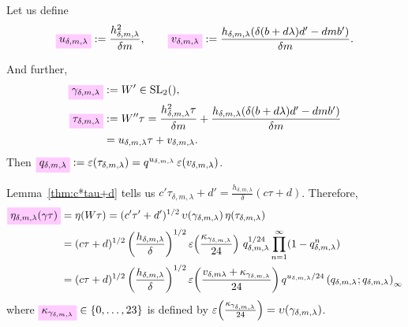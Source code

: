 \documentclass{article}
\begin{document}
Let us define
\begin{gather}
  \defineNotation[u-delta-m-lambda]{u_{\delta,m,\lambda}}
  :=
  \frac{h_{\delta,m,\lambda}^2}{\delta m},
  \qquad
  \defineNotation[v-delta-m-lambda]{v_{\delta,m,\lambda}}
  :=
  \frac{h_{\delta,m,\lambda}(\delta (b + d \lambda) d' - d m b')}{\delta m}.
  \label{eq:uv_delta-m-lambda}
\end{gather}

And further,
\begin{align}
  \defineNotation[gamma-delta-m-lambda]{\gamma_{\delta,m,\lambda}}
  &:=
    W'\in\SL2Z,
    \label{eq:gamma_delta-m-lambda}
  \\
  \defineNotation[tau-delta-m-lambda]{\tau_{\delta,m,\lambda}}
  &:=
    W''\tau
    = \frac{h_{\delta,m,\lambda}^2 \tau}{\delta m} +
    \frac{h_{\delta,m,\lambda}(\delta (b + d \lambda) d' - d m
    b')}{\delta m}
  \notag\\
    &= u_{\delta,m,\lambda} \tau + v_{\delta,m,\lambda}.
  \label{eq:tau_delta-m-lambda}
\end{align}
Then
$\defineNotation[q-delta-m-lambda]{q_{\delta,m,\lambda}} :=
\unityPower{\tau_{\delta,m,\lambda}} =
q^{u_{\delta,m,\lambda}}\,\unityPower{v_{\delta,m,\lambda}}$.


Lemma~\ref{thm:c*tau+d} tells us
$c'\tau_{\delta,m,\lambda}+d' = \frac{h_{\delta,m,\lambda}}{\delta} (c \tau + d)$.
%
Therefore,
\begin{align}
  \defineNotation[eta_delta-m-lambda-gamma-tau]{\eta_{\delta,m,\lambda}(\gamma \tau)}
  &= \eta(W \tau)
    = (c'\tau'+d')^{1/2} \, \upsilon(\gamma_{\delta,m,\lambda})
    \,\eta(\tau_{\delta,m,\lambda})\notag\\
  &=
    (c\tau+d)^{1/2}
    \left(\frac{h_{\delta,m,\lambda}}{\delta}\right)^{1/2}
    \unityPower{\frac{\kappa_{\gamma_{\delta,m,\lambda}}}{24}} \,
    q_{\delta,m,\lambda}^{1/24}
    \prod_{n=1}^\infty (1-q_{\delta,m,\lambda}^n)\notag\\
  &=
    (c\tau+d)^{1/2}
    \left(\frac{h_{\delta,m,\lambda}}{\delta}\right)^{1/2}
    \unityPower{\frac{ v_{\delta,m\lambda} + \kappa_{\gamma_{\delta,m,\lambda}}}{24}}
    q^{u_{\delta,m,\lambda}/24}
    \eulerFunction[q_{\delta,m,\lambda}]{}
    \label{eq:eta_delta-m-lambda(gamma*tau)}
\end{align}
where
$\defineNotation[kappa-gamma-delta-m-lambda]{\kappa_{\gamma_{\delta,m,\lambda}}}
\in \Set{0,\ldots,23}$ is defined by
$\varepsilon\!\left(\frac{\kappa_{\gamma_{\delta,m,\lambda}}}{24}\right) =
\upsilon(\gamma_{\delta,m,\lambda})$.
\end{document}
